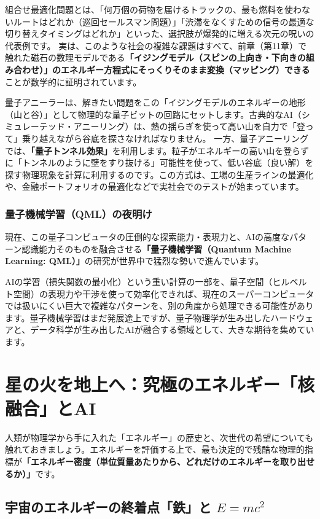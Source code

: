 組合せ最適化問題とは、「何万個の荷物を届けるトラックの、最も燃料を使わないルートはどれか（巡回セールスマン問題）」「渋滞をなくすための信号の最適な切り替えタイミングはどれか」といった、選択肢が爆発的に増える次元の呪いの代表例です。 実は、このような社会の複雑な課題はすべて、前章（第11章）で触れた磁石の数理モデルである\textbf{「イジングモデル（スピンの上向き・下向きの組み合わせ）」のエネルギー方程式にそっくりそのまま変換（マッピング）できる}ことが数学的に証明されています。

量子アニーラーは、解きたい問題をこの「イジングモデルのエネルギーの地形（山と谷）」として物理的な量子ビットの回路にセットします。古典的なAI（シミュレーテッド・アニーリング）は、熱の揺らぎを使って高い山を自力で「登って」乗り越えながら谷底を探さなければなりません。 一方、量子アニーリングでは、\textbf{「量子トンネル効果」}を利用します。粒子がエネルギーの高い山を登らずに「トンネルのように壁をすり抜ける」可能性を使って、低い谷底（良い解）を探す物理現象を計算に利用するのです。この方式は、工場の生産ラインの最適化や、金融ポートフォリオの最適化などで実社会でのテストが始まっています。

\subsubsection{量子機械学習（QML）の夜明け}

現在、この量子コンピュータの圧倒的な探索能力・表現力と、AIの高度なパターン認識能力そのものを融合させる\textbf{「量子機械学習（Quantum Machine Learning: QML）」}の研究が世界中で猛烈な勢いで進んでいます。

AIの学習（損失関数の最小化）という重い計算の一部を、量子空間（ヒルベルト空間）の表現力や干渉を使って効率化できれば、現在のスーパーコンピュータでは扱いにくい巨大で複雑なパターンを、別の角度から処理できる可能性があります。量子機械学習はまだ発展途上ですが、量子物理学が生み出したハードウェアと、データ科学が生み出したAIが融合する領域として、大きな期待を集めています。

\section{星の火を地上へ：究極のエネルギー「核融合」とAI}

人類が物理学から手に入れた「エネルギー」の歴史と、次世代の希望についても触れておきましょう。エネルギーを評価する上で、最も決定的で残酷な物理的指標が\textbf{「エネルギー密度（単位質量あたりから、どれだけのエネルギーを取り出せるか）」}です。

\subsection{宇宙のエネルギーの終着点「鉄」と \(E=mc^2\)}

